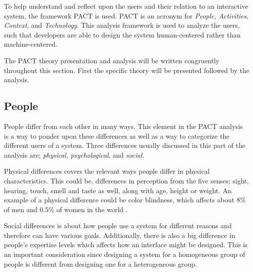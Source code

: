 To help understand and reflect upon the users and their relation to an interactive system, the framework PACT is used.
PACT is an acronym for \textit{People, Activities, Context}, and \textit{Technology}.
This analysis framework is used to analyze the users, such that developers are able to design the system human-centered rather than machine-centered.

The PACT theory presentation and analysis will be written congruently throughout this section. First the specific theory will be presented followed by the analysis.

\subsection{People}\label{sec:PACT-people}
People differ from each other in many ways.
This element in the PACT analysis is a way to ponder upon these differences as well as a way to categorize the different users of a system.
Three differences usually discussed in this part of the analysis are; \textit{physical, psychological}, and \textit{social}. 

Physical differences covers the relevant ways people differ in physical characteristics.
This could be, differences in perception from the five senses; sight, hearing, touch, smell and taste as well, along with age, height or weight.
An example of a physical difference could be color blindness, which affects about $8\%$ of men and $0.5\%$ of women in the world \cite{ColourBlind}.

Social differences is about how people use a system for different reasons and therefore can have various goals.
Additionally, there is also a big difference in people's expertise levels which affects how an interface might be designed.
This is an important consideration since designing a system for a homogeneous group of people is  different from designing one for a heterogeneous group. 


